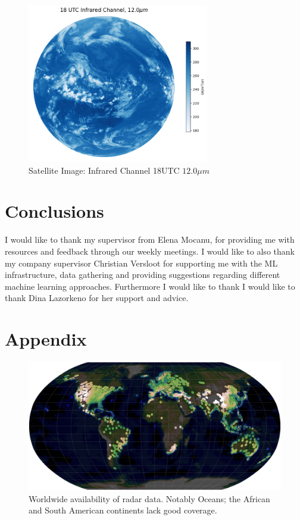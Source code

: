 \documentclass[acmtog, screen, balance]{acmart}
\begin{document}
\begin{figure}
    \centering
    \includegraphics[width=225pt]{./images/infrared.png}
    \caption{Satellite Image: Infrared Channel 18UTC $12.0\mu m$}
    \label{fig:infra}
\end{figure}


\section{Conclusions}


\begin{acks}
I would like to thank my supervisor from Elena Mocanu, for providing me with resources and feedback through our weekly meetings.
I would like to also thank my company supervisor Christian Versloot for supporting me with the ML infrastructure,
data gathering and providing suggestions regarding different machine learning approaches.
Furthermore I would like to thank I would like to thank Dina Lazorkeno for her support and advice.
\end{acks}




\newpage
\appendix
\section{Appendix}

\begin{figure}[hbp]
  \centering
  \includegraphics[width=400pt]{./images/full-bams-d-18-0166.1-f1.jpg}
  \caption{Worldwide availability of radar data. Notably Oceans; the African and South American continents lack good coverage. \cite{AnOverviewofUsingWeatherRadarforClimatologicalStudiesSuccessesChallengesandPotential}}
  \Description{}
  \label{fig:radar-availability}
\end{figure}
\end{document}
